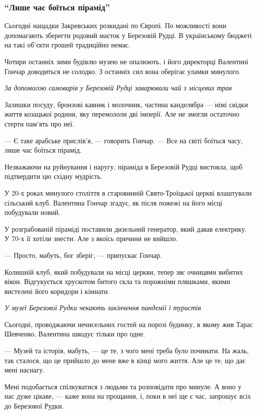 \documentclass[a4paper,11pt]{extreport}
\begin{document}
\subsubsection{``Лише час боїться пірамід''}

Сьогодні нащадки Закревських розкидані по Європі. По можливості вони
допомагають зберегти родовий маєток у Березовій Рудці. В українському бюджеті
на такі об'єкти грошей традиційно немає.

Чотири останніх зими будівлю музею не опалюють, і його директорці Валентині
Гончар доводиться не солодко. З останніх сил вона оберігає уламки минулого.

\emph{За допомогою самоварів у Березовій Рудці заварювали чай з місцевих трав}

Залишки посуду, бронзові кавник і молочник, частина канделябра --- німі свідки життя козацької родини, яку перемололи дві імперії. Але не змогли остаточно стерти пам'ять про неї.

--- Є таке арабське прислів’я, --- говорить Гончар. --- Все на світі боїться часу, лише час боїться пірамід.

Незважаючи на руйнування і наругу, піраміда в Березовій Рудці вистояла, щоб підтвердити цю східну мудрість.

У 20-х роках минулого століття в старовинній Свято-Троїцької церкві влаштували сільський клуб. Валентина Гончар згадує, як після пожежі на його місці побудували новий.

У розграбованій піраміді поставили дизельний генератор, який давав електрику. У 70-х її хотіли знести. Але з якоїсь причини не вийшло.

--- Просто, мабуть, бог зберіг, --- припускає Гончар.

Колишній клуб, який побудували на місці церкви, тепер зяє очницями вибитих вікон. Відгукується хрускотом битого скла та порожніми пляшками, якими вистелені його коридори і кімнати.

\emph{У музеї Березової Рудки чекають закінчення пандемії і туристів}

Сьогодні, проводжаючи нечисельних гостей на порозі будинку, в якому жив Тарас
Шевченко, Валентина шкодує тільки про одне.

--- Музей та історія, мабуть, --- це те, з чого мені треба було починати. На жаль,
так сталося, що це прийшло до мене вже в кінці мого життя. Але це те, що дає
мені наснагу. 

Мені подобається спілкуватися з людьми та розповідати про минуле. А воно у нас
дуже цікаве, --- каже вона на прощання, і, поки в неї ще є час, запрошує всіх до
Березової Рудки.
\end{document}
